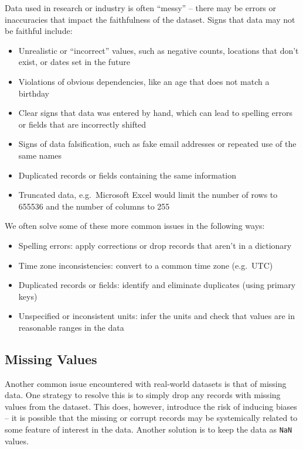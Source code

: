 \documentclass[
  letterpaper,
  DIV=11,
  numbers=noendperiod]{scrreprt}
\providecommand{\tightlist}{%
  \setlength{\itemsep}{0pt}\setlength{\parskip}{0pt}}\usepackage{longtable,booktabs,array}
\begin{document}
Data used in research or industry is often ``messy'' -- there may be
errors or inaccuracies that impact the faithfulness of the dataset.
Signs that data may not be faithful include:

\begin{itemize}
\tightlist
\item
  Unrealistic or ``incorrect'' values, such as negative counts,
  locations that don't exist, or dates set in the future
\item
  Violations of obvious dependencies, like an age that does not match a
  birthday
\item
  Clear signs that data was entered by hand, which can lead to spelling
  errors or fields that are incorrectly shifted
\item
  Signs of data falsification, such as fake email addresses or repeated
  use of the same names
\item
  Duplicated records or fields containing the same information
\item
  Truncated data, e.g.~Microsoft Excel would limit the number of rows to
  655536 and the number of columns to 255
\end{itemize}

We often solve some of these more common issues in the following ways:

\begin{itemize}
\tightlist
\item
  Spelling errors: apply corrections or drop records that aren't in a
  dictionary
\item
  Time zone inconsistencies: convert to a common time zone (e.g.~UTC)
\item
  Duplicated records or fields: identify and eliminate duplicates (using
  primary keys)
\item
  Unspecified or inconsistent units: infer the units and check that
  values are in reasonable ranges in the data
\end{itemize}

\subsection{Missing Values}\label{missing-values}

Another common issue encountered with real-world datasets is that of
missing data. One strategy to resolve this is to simply drop any records
with missing values from the dataset. This does, however, introduce the
risk of inducing biases -- it is possible that the missing or corrupt
records may be systemically related to some feature of interest in the
data. Another solution is to keep the data as \texttt{NaN} values.
\end{document}
